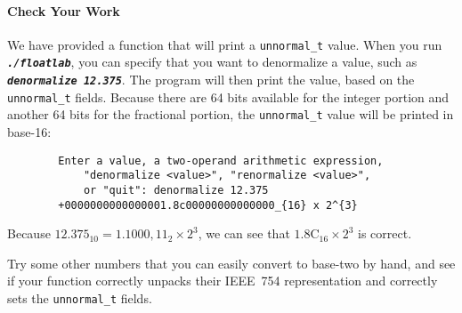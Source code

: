 \paragraph*{Check Your Work}

We have provided a function that will print a \lstinline{unnormal_t} value.
When you run \texttt{\textbf{\textit{./floatlab}}}, you can specify that you want to denormalize a value, such as \texttt{\textbf{\textit{denormalize 12.375}}}.
The program will then print the value, based on the \lstinline{unnormal_t} fields.
Because there are 64 bits available for the integer portion and another 64 bits for the fractional portion, the \lstinline{unnormal_t} value will be printed in base-16:

\begin{verbatim}
        Enter a value, a two-operand arithmetic expression,
            "denormalize <value>", "renormalize <value>",
            or "quit": denormalize 12.375
        +0000000000000001.8c00000000000000_{16} x 2^{3}
\end{verbatim}

Because $12.375_{10} = 1.1000,11_{2} \times 2^3$, we can see that $1.8\mathrm{C}_{16} \times 2^3$ is correct.

%
%
%

Try some other numbers that you can easily convert to base-two by hand, and see if your  function correctly unpacks their IEEE~754 representation and correctly sets the \lstinline{unnormal_t} fields.
